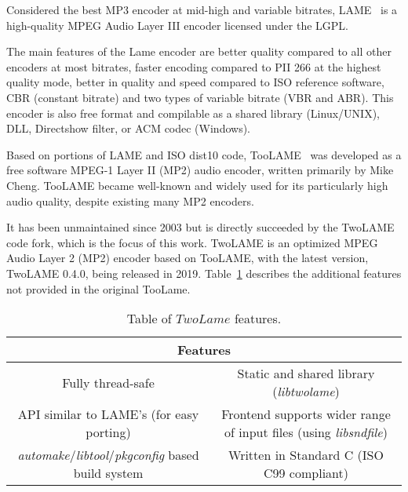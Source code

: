 Considered the best MP3 encoder at mid-high and variable bitrates, LAME~\cite{lame} is a high-quality MPEG Audio Layer III encoder licensed under the LGPL.

The main features of the Lame encoder are better quality compared to all other encoders at most bitrates, faster encoding compared to PII 266 at the highest quality mode, better in quality and speed compared to ISO reference software, CBR (constant bitrate) and two types of variable bitrate (VBR and ABR). This encoder is also free format and compilable as a shared library (Linux/UNIX), DLL, Directshow filter, or ACM codec (Windows).

Based on portions of LAME and ISO dist10 code, TooLAME~\cite{toolame} was developed as a free software MPEG-1 Layer II (MP2) audio encoder, written primarily by Mike Cheng.
TooLAME became well-known and widely used for its particularly high audio quality, despite existing many MP2 encoders.

It has been unmaintained since 2003 but is directly succeeded by the TwoLAME~\cite{twolame} code fork, which is the focus of this work.
TwoLAME is an optimized MPEG Audio Layer 2 (MP2) encoder based on TooLAME, with the latest version, TwoLAME 0.4.0, being released in 2019.
Table~\ref{tab:twolame} describes the additional features not provided in the original TooLame.

\begin{table}[h]
    \centering
    \begin{tabular}{|c|c|}
        \hline
        \multicolumn{2}{|c|}{\textbf{Features}} \\
        \hline
         Fully thread-safe & Static and shared library (\textit{libtwolame}) \\
         \hline
         API similar to LAME's (for easy porting) & Frontend supports wider range of input files (using \textit{libsndfile}) \\
         \hline
         \textit{automake}/\textit{libtool}/\textit{pkgconfig} based build system & Written in Standard C (ISO C99 compliant)\\
         \hline
    \end{tabular}
    \caption{Table of $TwoLame$ features.}
    \label{tab:twolame}
\end{table}
